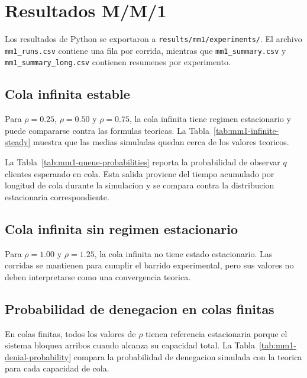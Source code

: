 \section{Resultados M/M/1}

Los resultados de Python se exportaron a \texttt{results/mm1/experiments/}. El archivo \texttt{mm1\_runs.csv} contiene una fila por corrida, mientras que \texttt{mm1\_summary.csv} y \texttt{mm1\_summary\_long.csv} contienen resumenes por experimento.

\subsection{Cola infinita estable}

Para $\rho=0.25$, $\rho=0.50$ y $\rho=0.75$, la cola infinita tiene regimen estacionario y puede compararse contra las formulas teoricas. La Tabla~\ref{tab:mm1-infinite-steady} muestra que las medias simuladas quedan cerca de los valores teoricos.



La Tabla~\ref{tab:mm1-queue-probabilities} reporta la probabilidad de observar $q$ clientes esperando en cola. Esta salida proviene del tiempo acumulado por longitud de cola durante la simulacion y se compara contra la distribucion estacionaria correspondiente.



\subsection{Cola infinita sin regimen estacionario}

Para $\rho=1.00$ y $\rho=1.25$, la cola infinita no tiene estado estacionario. Las corridas se mantienen para cumplir el barrido experimental, pero sus valores no deben interpretarse como una convergencia teorica.



\subsection{Probabilidad de denegacion en colas finitas}

En colas finitas, todos los valores de $\rho$ tienen referencia estacionaria porque el sistema bloquea arribos cuando alcanza su capacidad total. La Tabla~\ref{tab:mm1-denial-probability} compara la probabilidad de denegacion simulada con la teorica para cada capacidad de cola.

